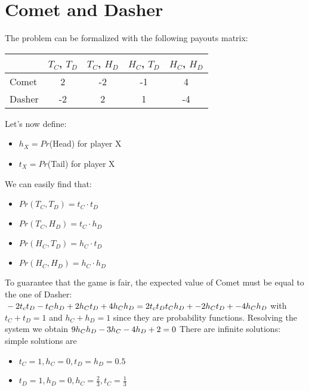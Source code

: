 \section{Comet and Dasher}
The problem can be formalized with the following payouts matrix:
\begin{center}
	\begin{tabular}{l*{4}{c}}
		& $T_C$, $T_D$ & $T_C$, $H_D$ & $H_C$, $T_D$ & $H_C$, $H_D$ \\
		\hline
		Comet & 2 & -2 & -1 & 4 \\
		\hline
		Dasher & -2 & 2 & 1 & -4 \\
	\end{tabular}
	
\end{center}
Let's now define:
\begin{itemize}
\item $h_X = Pr$(Head) for player X
\item $t_X = Pr$(Tail) for player X
\end{itemize}

We can easily find that:
\begin{itemize}
\item $Pr(T_C, T_D) = t_C \cdot t_D$
\item $Pr(T_C, H_D) = t_C \cdot h_D$
\item $Pr(H_C, T_D) = h_C \cdot t_D$
\item $Pr(H_C, H_D) = h_C \cdot h_D$
\end{itemize}
To guarantee that the game is fair, the expected value of Comet must be equal to the one of Dasher:
$\newline\newline-2 t_c t_D -t_C h_D + 2h_C t_D + 4 h_C h_D = 2 t_c t_D t_C h_D + -2h_C t_D + -4 h_C h_D\newline\newline$
with $t_C + t_D = 1$ and $h_C + h_D = 1$ since they are probability functions.
Resolving the system we obtain 
$\newline\newline9h_C h_D -3h_C - 4h_D +2 = 0\newline\newline$
There are infinite solutions: simple solutions are 
\begin{itemize}
	\item $t_C = 1, h_C = 0, t_D = h_D = 0.5$
	\item $t_D = 1, h_D = 0, h_C = \frac{2}{3}, t_C = \frac{1}{3}$	
\end{itemize}

